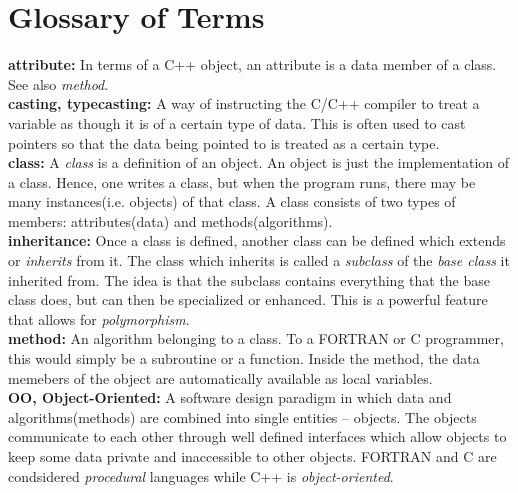 \documentclass[12pt]{article}
\begin{document}


\newpage
\section{Glossary of Terms}
\label{glossary}

{\bf attribute:} In terms of a C++ object, an attribute is a data
member of a class. See also {\it method}.\\

{\bf casting, typecasting:} A way of instructing the C/C++ compiler to
treat a variable as though it is of a certain type of data. This is
often used to cast pointers so that the data being pointed to is treated
as a certain type.\\


{\bf class:} A {\it class} is a definition of an object. An object
is just the implementation of a class. Hence, one writes a class, but
when the program runs, there may be many instances(i.e. objects) of that
class. A class consists of two types of members: attributes(data) and
methods(algorithms).\\


{\bf inheritance:} Once a class is defined, another class can be
defined which extends or {\it inherits} from it. The class which inherits
is called a {\it subclass} of the {\it base class} it inherited from.
The idea is that the subclass contains everything that the base class
does, but can then be specialized or enhanced. This is a powerful feature
that allows for {\it polymorphism}.\\


{\bf method:} An algorithm belonging to a class. To a FORTRAN or C
programmer, this would simply be a subroutine or a function. Inside
the method, the data memebers of the object are automatically available as
local variables.\\


{\bf OO, Object-Oriented:} A software design paradigm in which data
and algorithms(methods) are combined into single entities -- objects. The
objects communicate to each other through well defined interfaces which
allow objects to keep some data private and inaccessible to other objects.
FORTRAN and C are condsidered {\it procedural} languages while C++ is
{\it object-oriented}.\\
\end{document}
